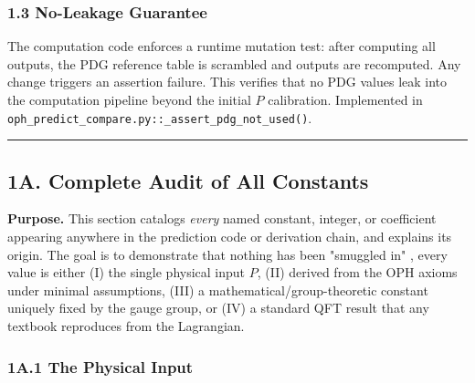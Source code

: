 \subsubsection{1.3 No-Leakage Guarantee}\label{13-no-leakage-guarantee}

The computation code enforces a runtime mutation test: after computing all outputs, the PDG reference table is scrambled and outputs are recomputed. Any change triggers an assertion failure. This verifies that no PDG values leak into the computation pipeline beyond the initial \(P\) calibration. Implemented in \texttt{oph\_predict\_compare.py::\_assert\_pdg\_not\_used()}.

\begin{center}\rule{0.5\linewidth}{0.5pt}\end{center}

\subsection{1A. Complete Audit of All Constants}\label{1a-complete-audit-of-all-constants}

\textbf{Purpose.} This section catalogs \emph{every} named constant, integer, or coefficient appearing anywhere in the prediction code or derivation chain, and explains its origin. The goal is to demonstrate that nothing has been "smuggled in" , every value is either (I) the single physical input \(P\), (II) derived from the OPH axioms under minimal assumptions, (III) a mathematical/group-theoretic constant uniquely fixed by the gauge group, or (IV) a standard QFT result that any textbook reproduces from the Lagrangian.

\subsubsection{1A.1 The Physical Input}\label{1a1-the-physical-input}

